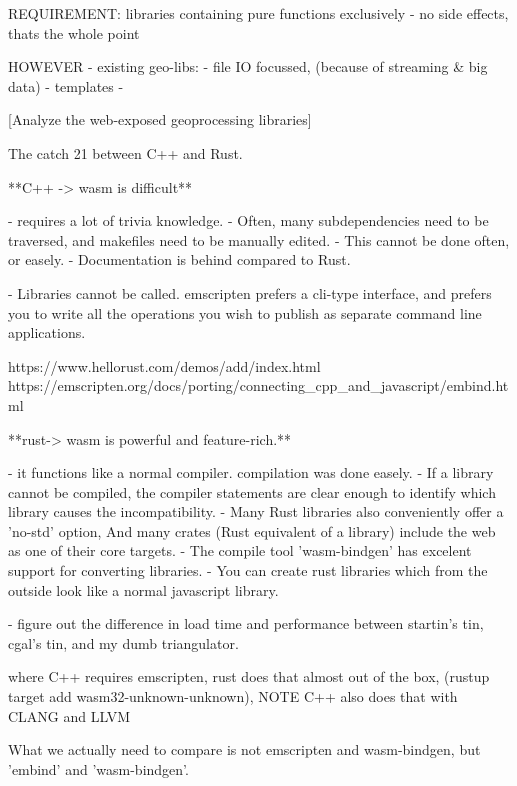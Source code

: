 \begin{note}

  REQUIREMENT: libraries containing pure functions exclusively
  - no side effects, thats the whole point
  
  
  HOWEVER 
  - existing geo-libs: 
    - file IO focussed, (because of streaming \& big data)
    - templates
    - 
  
  [Analyze the web-exposed geoprocessing libraries]
  
  
  The catch 21 between C++ and Rust.  

  **C++ -> wasm is difficult**
  
  - requires a lot of trivia knowledge. 
    - Often, many subdependencies need to be traversed, and makefiles need to be manually edited. 
    - This cannot be done often, or easely. 
  - Documentation is behind compared to Rust.

  - Libraries cannot be called. emscripten prefers a cli-type interface, and prefers you to write all the operations you wish to publish as separate command line applications. 

  https://www.hellorust.com/demos/add/index.html
  https://emscripten.org/docs/porting/connecting_cpp_and_javascript/embind.html


  **rust-> wasm is powerful and feature-rich.** 
  
  - it functions like a normal compiler. compilation was done easely. 
  - If a library cannot be compiled, the compiler statements are clear enough to identify which library causes the incompatibility. 
  - Many Rust libraries also conveniently offer a 'no-std' option, 
    And many crates (Rust equivalent of a library) include the web as one of their core targets. 
  - The compile tool 'wasm-bindgen' has excelent support for converting libraries. 
    - You can create rust libraries which from the outside look like a normal javascript library. 


    - figure out the difference in load time and performance between startin's tin, cgal's tin, and my dumb triangulator.

\end{note}

\begin{note}
  where C++ requires emscripten, rust does that almost out of the box, (rustup target add wasm32-unknown-unknown), NOTE C++ also does that with CLANG and LLVM

  What we actually need to compare is not emscripten and wasm-bindgen, but 'embind' and 'wasm-bindgen'. 
\end{note}

